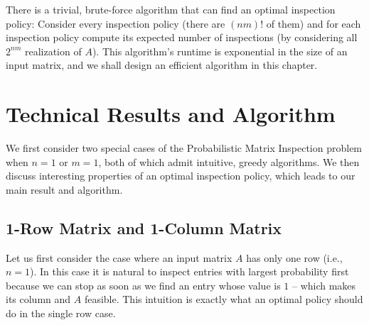 There is a trivial, brute-force algorithm that can find an optimal inspection policy: Consider every inspection policy (there are $(nm)!$ of them) and for each inspection policy compute its expected number of inspections (by considering all $2^{nm}$ realization of $A$). This algorithm's runtime is exponential in the size of an input matrix, and we shall design an efficient algorithm in this chapter.


\section{Technical Results and Algorithm} \label{matrix:sec:results}

We first consider two special cases of the Probabilistic Matrix Inspection problem when $n=1$ or $m=1$, both of which admit intuitive, greedy algorithms. We then discuss interesting properties of an optimal inspection policy, which leads to our main result and algorithm.

 \subsection{1-Row Matrix and 1-Column Matrix}
 Let us first consider the case where an input matrix $A$ has only one row (i.e., $n = 1$).
 In this case it is natural to inspect entries with largest probability first because we can stop as soon as we find an entry whose value is $1$ -- which makes its column and $A$ feasible. This intuition is exactly what an optimal policy should do in the single row case.

